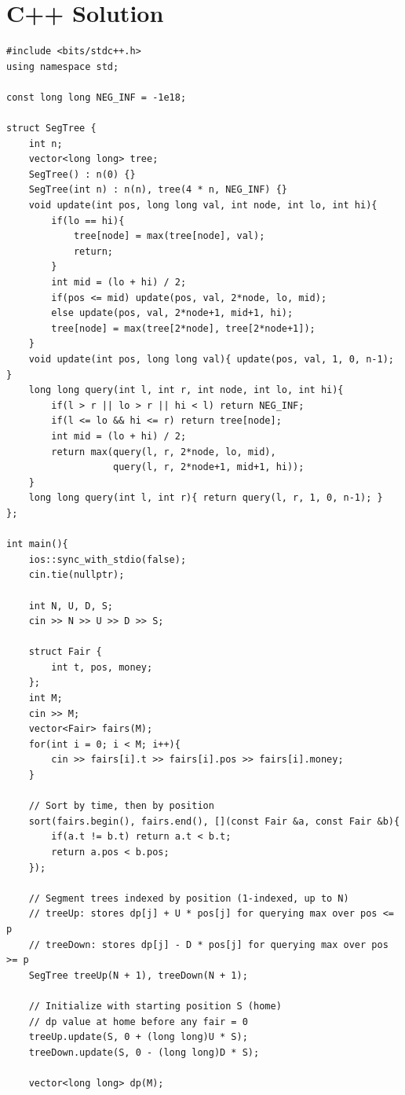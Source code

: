 \documentclass[11pt,a4paper]{article}
\begin{document}
\section{C++ Solution}
\begin{lstlisting}
#include <bits/stdc++.h>
using namespace std;

const long long NEG_INF = -1e18;

struct SegTree {
    int n;
    vector<long long> tree;
    SegTree() : n(0) {}
    SegTree(int n) : n(n), tree(4 * n, NEG_INF) {}
    void update(int pos, long long val, int node, int lo, int hi){
        if(lo == hi){
            tree[node] = max(tree[node], val);
            return;
        }
        int mid = (lo + hi) / 2;
        if(pos <= mid) update(pos, val, 2*node, lo, mid);
        else update(pos, val, 2*node+1, mid+1, hi);
        tree[node] = max(tree[2*node], tree[2*node+1]);
    }
    void update(int pos, long long val){ update(pos, val, 1, 0, n-1); }
    long long query(int l, int r, int node, int lo, int hi){
        if(l > r || lo > r || hi < l) return NEG_INF;
        if(l <= lo && hi <= r) return tree[node];
        int mid = (lo + hi) / 2;
        return max(query(l, r, 2*node, lo, mid),
                   query(l, r, 2*node+1, mid+1, hi));
    }
    long long query(int l, int r){ return query(l, r, 1, 0, n-1); }
};

int main(){
    ios::sync_with_stdio(false);
    cin.tie(nullptr);

    int N, U, D, S;
    cin >> N >> U >> D >> S;

    struct Fair {
        int t, pos, money;
    };
    int M;
    cin >> M;
    vector<Fair> fairs(M);
    for(int i = 0; i < M; i++){
        cin >> fairs[i].t >> fairs[i].pos >> fairs[i].money;
    }

    // Sort by time, then by position
    sort(fairs.begin(), fairs.end(), [](const Fair &a, const Fair &b){
        if(a.t != b.t) return a.t < b.t;
        return a.pos < b.pos;
    });

    // Segment trees indexed by position (1-indexed, up to N)
    // treeUp: stores dp[j] + U * pos[j] for querying max over pos <= p
    // treeDown: stores dp[j] - D * pos[j] for querying max over pos >= p
    SegTree treeUp(N + 1), treeDown(N + 1);

    // Initialize with starting position S (home)
    // dp value at home before any fair = 0
    treeUp.update(S, 0 + (long long)U * S);
    treeDown.update(S, 0 - (long long)D * S);

    vector<long long> dp(M);


\end{lstlisting}
\end{document}
